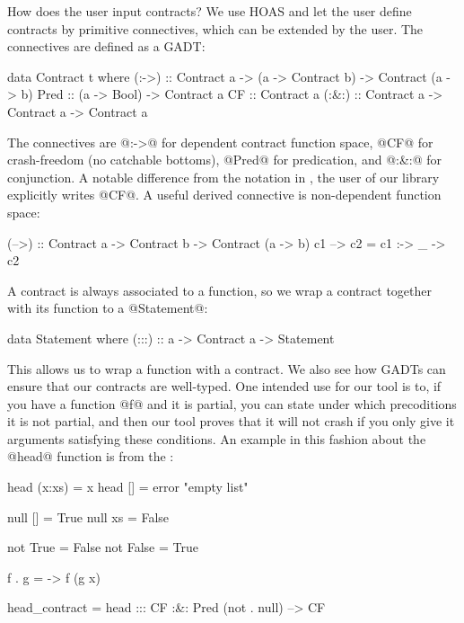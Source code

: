 How does the user input contracts? We use HOAS and let the user define
contracts by primitive connectives, which can be extended by the user.
The connectives are defined as a GADT:

\begin{code}
data Contract t where
  (:->) :: Contract a
        -> (a -> Contract b)
        -> Contract (a -> b)
  Pred  :: (a -> Bool) -> Contract a
  CF    :: Contract a
  (:&:) :: Contract a -> Contract a -> Contract a
\end{code}

The connectives are @:->@ for dependent contract function space, @CF@
for crash-freedom (no catchable bottoms), @Pred@ for predication, and
@:&:@ for conjunction. A notable difference from the notation in
\cite{xu+:contracts}, the user of our library explicitly writes @CF@.
A useful derived connective is non-dependent function space:

\begin{code}
(-->) :: Contract a -> Contract b -> Contract (a -> b)
c1 --> c2 = c1 :-> \_ -> c2
\end{code}

%
%

A contract is always associated to a function, so we wrap a contract
together with its function to a @Statement@:

\begin{code}
data Statement where
    (:::) :: a -> Contract a -> Statement
\end{code}

This allows us to wrap a function with a contract.  We also see how
GADTs can ensure that our contracts are well-typed.  One intended use
for our tool is to, if you have a function @f@ and it is partial, you
can state under which precoditions it is not partial, and then our
tool proves that it will not crash if you only give it arguments
satisfying these conditions. An example in this fashion about the
@head@ function is from the \cite{xu+:contracts}:

\begin{code}
head (x:xs) = x
head []     = error "empty list"

null [] = True
null xs = False

not True = False
not False = True

f . g = \x -> f (g x)

head_contract =
    head ::: CF :&: Pred (not . null) --> CF
\end{code}


